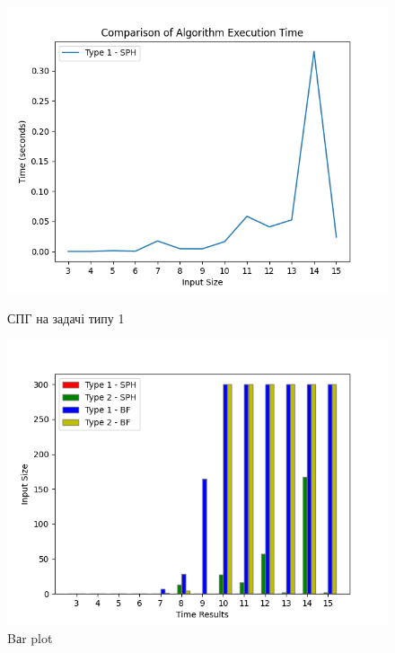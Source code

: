 \documentclass[a4paper,12pt]{article}
\begin{document}
\begin{figure}[!htb]
  \includegraphics[width=\linewidth]{plot5.png}
  \caption{СПГ на задачі типу 1}\label{fig:sph1}
\endminipage\hfill
{}
  \includegraphics[width=\linewidth]{plot6.png}
  \caption{Bаr plot}\label{fig:Bаrplot}
\endminipage\hfill
\end{figure}\newpage 
\end{document}
